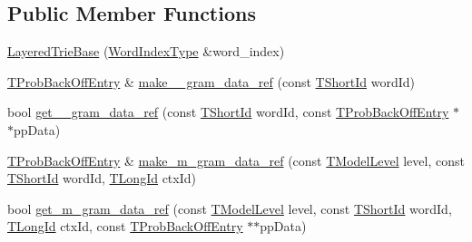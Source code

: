 \subsection*{Public Member Functions}
\begin{DoxyCompactItemize}
\item 
\hyperlink{classuva_1_1smt_1_1tries_1_1_layered_trie_base_a7a1ab8df909979ee43d80637a45c96b7}{Layered\+Trie\+Base} (\hyperlink{classuva_1_1smt_1_1tries_1_1_word_index_trie_base_a30c4fffe3a3423c87b229b66340dd2f8}{Word\+Index\+Type} \&word\+\_\+index)
\item 
\hyperlink{structuva_1_1smt_1_1tries_1_1_t_prob_back_off_entry}{T\+Prob\+Back\+Off\+Entry} \& \hyperlink{classuva_1_1smt_1_1tries_1_1_layered_trie_base_aff9e12b94ca02e27d6f8072254726de7}{make\+\_\+\_\+gram\+\_\+data\+\_\+ref} (const \hyperlink{namespaceuva_1_1smt_1_1hashing_adcf22e1982ad09d3a63494c006267469}{T\+Short\+Id} word\+Id)
\item 
bool \hyperlink{classuva_1_1smt_1_1tries_1_1_layered_trie_base_aa7140d9be8695cdb92075f40a1934f4a}{get\+\_\+\_\+gram\+\_\+data\+\_\+ref} (const \hyperlink{namespaceuva_1_1smt_1_1hashing_adcf22e1982ad09d3a63494c006267469}{T\+Short\+Id} word\+Id, const \hyperlink{structuva_1_1smt_1_1tries_1_1_t_prob_back_off_entry}{T\+Prob\+Back\+Off\+Entry} $\ast$$\ast$pp\+Data)
\item 
\hyperlink{structuva_1_1smt_1_1tries_1_1_t_prob_back_off_entry}{T\+Prob\+Back\+Off\+Entry} \& \hyperlink{classuva_1_1smt_1_1tries_1_1_layered_trie_base_a563683eef65f8b2829967a44c9fbf735}{make\+\_\+m\+\_\+gram\+\_\+data\+\_\+ref} (const \hyperlink{namespaceuva_1_1smt_1_1tries_a20577a44b3a42d26524250634379b7cb}{T\+Model\+Level} level, const \hyperlink{namespaceuva_1_1smt_1_1hashing_adcf22e1982ad09d3a63494c006267469}{T\+Short\+Id} word\+Id, \hyperlink{namespaceuva_1_1smt_1_1hashing_a5992ac0dea0fb3226fb403ede09fad55}{T\+Long\+Id} ctx\+Id)
\item 
bool \hyperlink{classuva_1_1smt_1_1tries_1_1_layered_trie_base_a20a29a5d8e231b7c13268c36064abc6e}{get\+\_\+m\+\_\+gram\+\_\+data\+\_\+ref} (const \hyperlink{namespaceuva_1_1smt_1_1tries_a20577a44b3a42d26524250634379b7cb}{T\+Model\+Level} level, const \hyperlink{namespaceuva_1_1smt_1_1hashing_adcf22e1982ad09d3a63494c006267469}{T\+Short\+Id} word\+Id, \hyperlink{namespaceuva_1_1smt_1_1hashing_a5992ac0dea0fb3226fb403ede09fad55}{T\+Long\+Id} ctx\+Id, const \hyperlink{structuva_1_1smt_1_1tries_1_1_t_prob_back_off_entry}{T\+Prob\+Back\+Off\+Entry} $\ast$$\ast$pp\+Data)
\item 

\end{DoxyCompactItemize}
